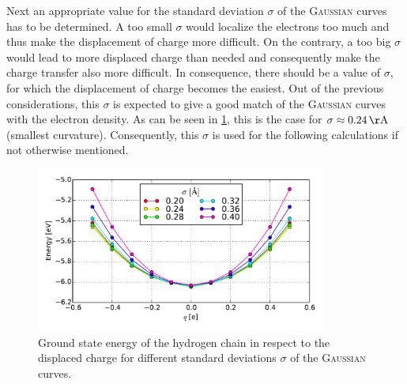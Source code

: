 Next an appropriate value for the standard deviation $\sigma$ of the \textsc{Gaussian} curves has to be determined. A too small $\sigma$ would localize the electrons too much and thus make the displacement of charge more difficult. On the contrary, a too big $\sigma$ would lead to more displaced charge than needed and consequently make the charge transfer also more difficult. In consequence, there should be a value of $\sigma$, for which the displacement of charge becomes the easiest. Out of the previous considerations, this $\sigma$ is expected to give a good match of the \textsc{Gaussian} curves with the electron density. As can be seen in \cref{image_gaussian_sigmas_hydrogen}, this is the case for $\sigma \approx \unit[0.24]{\AA}$ (smallest curvature). Consequently, this $\sigma$ is used for the following calculations if not otherwise mentioned.\\
\begin{figure}[!t]
	\centering
	\includegraphics[width = 9.5cm]{Images/Hydrogen/charging/gaussian_sigmas}
	\caption{Ground state energy of the hydrogen chain in respect to the displaced charge for different standard deviations $\sigma$ of the \textsc{Gaussian} curves.}
	\label{image_gaussian_sigmas_hydrogen}
\end{figure}
